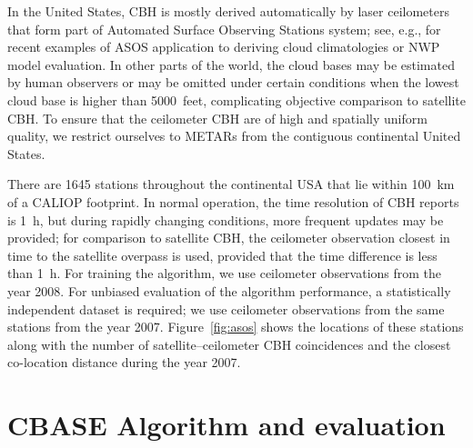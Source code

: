 \documentclass[essd,manuscript]{copernicus}\usepackage[]{graphicx}\usepackage[]{color}
\begin{document}
In the United States, CBH is mostly derived automatically by laser ceilometers
that form part of Automated Surface Observing Stations \citep[ASOS][]{asos}
system; see, e.g., \cite{An2017,Ikeda2017} for recent examples of ASOS
application to deriving cloud climatologies or NWP model evaluation.  In other
parts of the world, the cloud bases may be estimated by human observers or may
be omitted under certain conditions when the lowest cloud base is higher than
5000~feet, complicating objective comparison to satellite CBH.  To ensure that
the ceilometer CBH are of high and spatially uniform quality, we restrict
ourselves to METARs from the contiguous continental United States.

There are 1645 %
stations throughout the continental USA that lie within 100~km of a CALIOP
footprint.  In normal operation, the time resolution of CBH reports is 1~h, but
during rapidly changing conditions, more frequent updates may be provided; for
comparison to satellite CBH, the ceilometer observation closest in time to the
satellite overpass is used, provided that the time difference is less than 1~h.
For training the algorithm, we use ceilometer observations from the year 2008.
For unbiased evaluation of the algorithm performance, a statistically
independent dataset is required; we use ceilometer observations from the same
stations from the year 2007.  Figure~\ref{fig:asos} shows the locations of these
stations along with the number of satellite--ceilometer CBH coincidences and the
closest co-location distance during the year 2007.

\section{CBASE Algorithm and evaluation}
\label{sec:algorithm}
\end{document}
